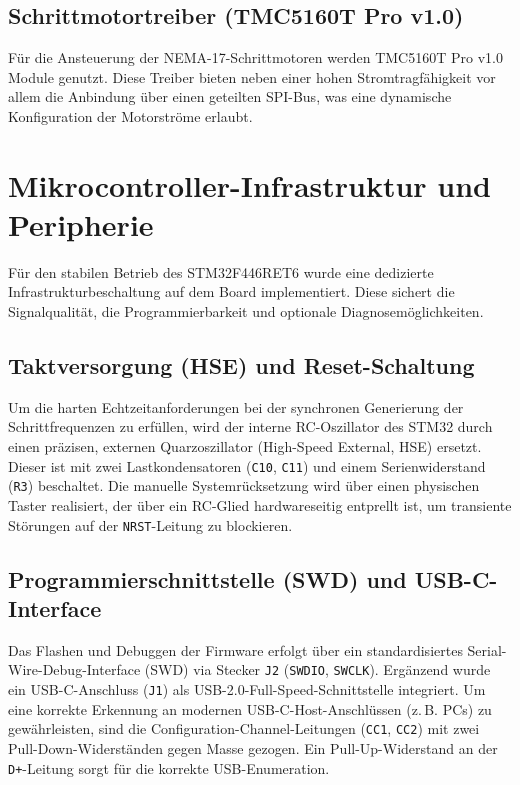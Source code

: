 \subsection{Schrittmotortreiber (TMC5160T Pro v1.0)}
Für die Ansteuerung der NEMA-17-Schrittmotoren werden TMC5160T Pro v1.0 Module genutzt. Diese Treiber bieten neben einer hohen Stromtragfähigkeit vor allem die Anbindung über einen geteilten SPI-Bus, was eine dynamische Konfiguration der Motorströme erlaubt.

\section{Mikrocontroller-Infrastruktur und Peripherie}
\label{subsec:mcu_infrastructure}
Für den stabilen Betrieb des STM32F446RET6 wurde eine dedizierte Infrastrukturbeschaltung auf dem Board implementiert. Diese sichert die Signalqualität, die Programmierbarkeit und optionale Diagnosemöglichkeiten.

\subsection{Taktversorgung (HSE) und Reset-Schaltung}
Um die harten Echtzeitanforderungen bei der synchronen Generierung der Schrittfrequenzen zu erfüllen, wird der interne RC-Oszillator des STM32 durch einen präzisen, externen Quarzoszillator (High-Speed External, HSE) ersetzt. Dieser ist mit zwei Lastkondensatoren (\texttt{C10}, \texttt{C11}) und einem Serienwiderstand (\texttt{R3}) beschaltet. Die manuelle Systemrücksetzung wird über einen physischen Taster realisiert, der über ein RC-Glied hardwareseitig entprellt ist, um transiente Störungen auf der \texttt{NRST}-Leitung zu blockieren.

\subsection{Programmierschnittstelle (SWD) und USB-C-Interface}
Das Flashen und Debuggen der Firmware erfolgt über ein standardisiertes Serial-Wire-Debug-Interface (SWD) via Stecker \texttt{J2} (\texttt{SWDIO}, \texttt{SWCLK}). Ergänzend wurde ein USB-C-Anschluss (\texttt{J1}) als USB-2.0-Full-Speed-Schnittstelle integriert. Um eine korrekte Erkennung an modernen USB-C-Host-Anschlüssen (z.\,B. PCs) zu gewährleisten, sind die Configuration-Channel-Leitungen (\texttt{CC1}, \texttt{CC2}) mit zwei Pull-Down-Widerständen gegen Masse gezogen. Ein Pull-Up-Widerstand an der \texttt{D+}-Leitung sorgt für die korrekte USB-Enumeration.



